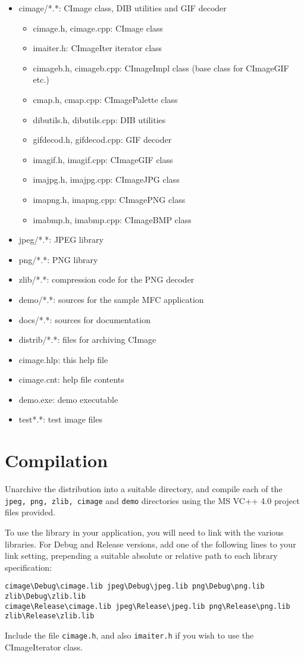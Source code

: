 \begin{itemize}\itemsep=0pt
\item cimage/*.*: CImage class, DIB utilities and GIF decoder
\begin{itemize}\itemsep=0pt
\item cimage.h, cimage.cpp: CImage class
\item imaiter.h: CImageIter iterator class
\item cimageb.h, cimageb.cpp: CImageImpl class (base class for CImageGIF etc.)
\item cmap.h, cmap.cpp: CImagePalette class
\item dibutils.h, dibutils.cpp: DIB utilities
\item gifdecod.h, gifdecod.cpp: GIF decoder
\item imagif.h, imagif.cpp: CImageGIF class
\item imajpg.h, imajpg.cpp: CImageJPG class
\item imapng.h, imapng.cpp: CImagePNG class
\item imabmp.h, imabmp.cpp: CImageBMP class
\end{itemize}
\item jpeg/*.*: JPEG library
\item png/*.*: PNG library
\item zlib/*.*: compression code for the PNG decoder
\item demo/*.*: sources for the sample MFC application
\item docs/*.*: sources for documentation
\item distrib/*.*: files for archiving CImage
\item cimage.hlp: this help file
\item cimage.cnt: help file contents
\item demo.exe: demo executable
\item test*.*: test image files
\end{itemize}

\chapter{Compilation}\label{compilation}
%
\setfooter{\thepage}{}{}{}{}{\thepage}%

Unarchive the distribution into a suitable directory, and compile each
of the {\tt jpeg, png, zlib, cimage} and {\tt demo} directories using the MS VC++
4.0 project files provided.

To use the library in your application, you will need to link with the
various libraries. For Debug and Release versions, add one of
the following lines to your link setting, prepending a suitable
absolute or relative path to each library specification:

\begin{verbatim}
cimage\Debug\cimage.lib jpeg\Debug\jpeg.lib png\Debug\png.lib zlib\Debug\zlib.lib
cimage\Release\cimage.lib jpeg\Release\jpeg.lib png\Release\png.lib zlib\Release\zlib.lib
\end{verbatim}

Include the file {\tt cimage.h}, and also {\tt imaiter.h} if you wish to use the
CImageIterator class.

